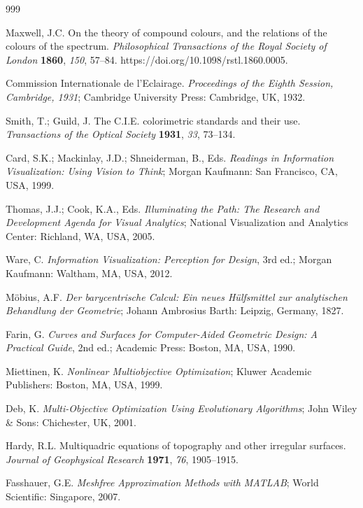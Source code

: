 \documentclass[preprints,article,submit,pdftex,oneauthor]{Definitions/mdpi}
\begin{document}
\begin{thebibliography}{999}

Maxwell, J.C. On the theory of compound colours, and the relations of the colours of the spectrum. \textit{Philosophical Transactions of the Royal Society of London} \textbf{1860}, \textit{150}, 57--84. https://doi.org/10.1098/rstl.1860.0005.

Commission Internationale de l'Eclairage. \textit{Proceedings of the Eighth Session, Cambridge, 1931}; Cambridge University Press: Cambridge, UK, 1932.

Smith, T.; Guild, J. The C.I.E. colorimetric standards and their use. \textit{Transactions of the Optical Society} \textbf{1931}, \textit{33}, 73--134.

Card, S.K.; Mackinlay, J.D.; Shneiderman, B., Eds. \textit{Readings in Information Visualization: Using Vision to Think}; Morgan Kaufmann: San Francisco, CA, USA, 1999.

Thomas, J.J.; Cook, K.A., Eds. \textit{Illuminating the Path: The Research and Development Agenda for Visual Analytics}; National Visualization and Analytics Center: Richland, WA, USA, 2005.

Ware, C. \textit{Information Visualization: Perception for Design}, 3rd ed.; Morgan Kaufmann: Waltham, MA, USA, 2012.

M{\"o}bius, A.F. \textit{Der barycentrische Calcul: Ein neues H{\"u}lfsmittel zur analytischen Behandlung der Geometrie}; Johann Ambrosius Barth: Leipzig, Germany, 1827.

Farin, G. \textit{Curves and Surfaces for Computer-Aided Geometric Design: A Practical Guide}, 2nd ed.; Academic Press: Boston, MA, USA, 1990.

Miettinen, K. \textit{Nonlinear Multiobjective Optimization}; Kluwer Academic Publishers: Boston, MA, USA, 1999.

Deb, K. \textit{Multi-Objective Optimization Using Evolutionary Algorithms}; John Wiley \& Sons: Chichester, UK, 2001.

Hardy, R.L. Multiquadric equations of topography and other irregular surfaces. \textit{Journal of Geophysical Research} \textbf{1971}, \textit{76}, 1905--1915.

Fasshauer, G.E. \textit{Meshfree Approximation Methods with MATLAB}; World Scientific: Singapore, 2007.

\end{thebibliography}
\end{document}

